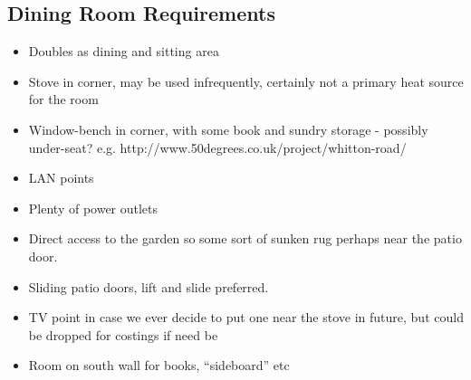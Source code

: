 \subsection{Dining Room Requirements}
\begin{itemize}
\item Doubles as dining and sitting area
\item Stove in corner, may be used infrequently, certainly not a primary heat source for the room
\item Window-bench in corner, with some book and sundry storage - possibly under-seat? e.g. http://www.50degrees.co.uk/project/whitton-road/
\item LAN points
\item Plenty of power outlets
\item Direct access to the garden so some sort of sunken rug perhaps near the patio door.
\item Sliding patio doors, lift and slide preferred.
\item TV point in case we ever decide to put one near the stove in future, but could be dropped for costings if need be
\item Room on south wall for books, ``sideboard'' etc
    

\end{itemize}
